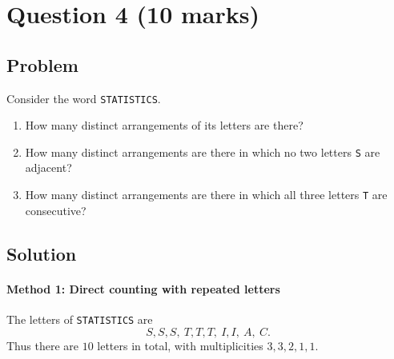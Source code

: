 \documentclass[12pt]{article}
\begin{document}
\newpage
\section{Question 4 \hfill (10 marks)}
\subsection{Problem}

Consider the word \texttt{STATISTICS}.

\begin{enumerate}[label=(\alph*)]
    \item How many distinct arrangements of its letters are there?
    \item How many distinct arrangements are there in which no two letters \texttt{S} are adjacent?
    \item How many distinct arrangements are there in which all three letters \texttt{T} are consecutive?
\end{enumerate}

\subsection{Solution}

\paragraph{Method 1: Direct counting with repeated letters}

The letters of \texttt{STATISTICS} are
\[
S,S,S,\ T,T,T,\ I,I,\ A,\ C.
\]
Thus there are $10$ letters in total, with multiplicities $3,3,2,1,1$.
\end{document}
